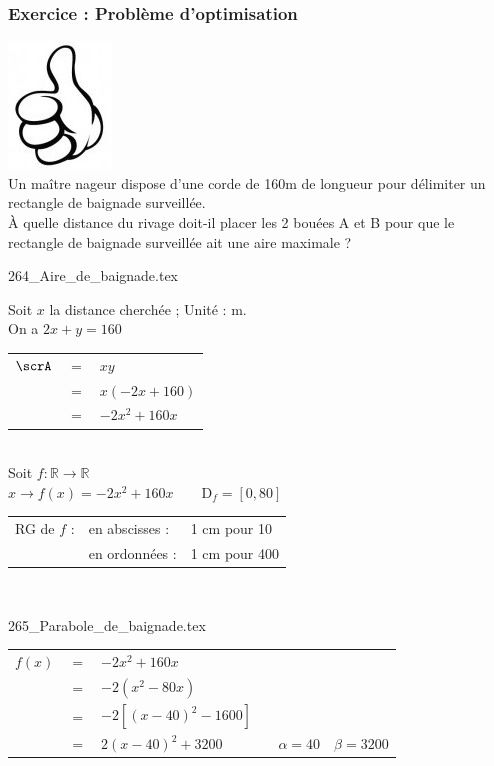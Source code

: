 \subsubsection{Exercice  : Problème d'optimisation }\includegraphics[width=.5cm]{264_Pouce_leve.jpg}\\

Un maître nageur dispose d'une corde de 160m de longueur pour délimiter un rectangle de baignade surveillée. \\

À quelle distance du rivage doit-il placer les 2 bouées A et B pour que le rectangle de baignade surveillée ait une aire maximale ? 

\bigskip 

\centerline{ {264_Aire_de_baignade.tex}}

\bigskip 

Soit $x$ la distance cherchée ; Unité : m. \\

On a $2x +y = 160 $ \\

\begin{tabular}{r@{$\;$}c@{$\;$}l}
$\scrA $ & $=$ & $xy$ \\
               & $=$ & $x (-2x+160)$ \\
               & $=$ & $-2x^2 +160x$ \\
\end{tabular}\\

Soit $f : \mathbb{R} \longrightarrow  \mathbb{R}$ \\
$x \longrightarrow f(x) = -2x^2 + 160x \qquad \mathrm{D}_f=[0,80]$ \\

\begin{tabular}{rll}
RG de $f$ : & en abscisses : & 1 cm pour  10 \\
            & en ordonnées : & 1 cm pour 400 \\
\end{tabular}\\

\centerline{ {265_Parabole_de_baignade.tex}}


\begin{tabular}{l@{$\;$}c@{$\;$}l}
$f(x)$ & $=$ & $-2x^2 +160x $\\
       & $=$ & $ -2(x^2 -80x) $\\
       & $=$ & $ -2[ (x-40)^2 - 1600]$ \\
       & $=$ & $ 2(x-40)^2 +3200 \qquad \qquad   \alpha = 40 \quad \beta = 3200 $ \\
\end{tabular} \\

